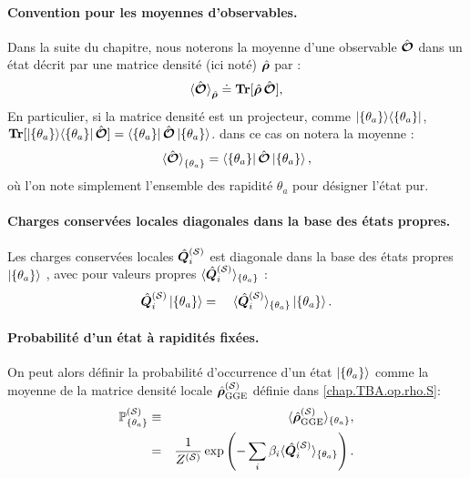 \paragraph{Convention pour les moyennes d'observables.}
Dans la suite du chapitre, nous noterons la moyenne d’une observable $\hat{\bm{\mathcal{O}}}$ dans un état décrit par une matrice densité (ici noté) $\hat{\bm{\rho}}$ par :
\begin{eqnarray}\label{chap.TBA.moy.dens}	
	\braket{\hat{\bm{\mathcal{O}}}}_{\hat{\bm{\rho}}} \doteq \bm{\mathrm{Tr}}[\hat{\bm{\rho}} \, \hat{\bm{\mathcal{O}}}],
\end{eqnarray}
En particulier, si la matrice densité est un projecteur, comme $\ket{\{\theta_a \}}\!\bra{\{\theta_a \}}$, $\bm{\mathrm{Tr}}[\ket{\{\theta_a \}}\!\bra{\{\theta_a \}} \hat{\bm{\mathcal{O}}}] =  \bra{\{\theta_a \}}\hat{\bm{\mathcal{O}}}\ket{\{\theta_a \}}$. dans ce cas on notera la moyenne :
\begin{eqnarray}\label{chap.TBA.moy.dens.pur}
	\braket{\hat{\bm{\mathcal{O}}}}_{\{\theta_a \}} = \bra{\{\theta_a \}} \hat{\bm{\mathcal{O}}} \ket{\{\theta_a \}},
\end{eqnarray}
où l’on note simplement l’ensemble des rapidité ${\theta_a}$ pour désigner l’état pur.

\paragraph{Charges conservées locales diagonales dans la base des états propres.}
Les charges conservées locales $\hat{\bm{Q}}_i^{(\mathcal{S})}$ est diagonale dans la base des  états propres $\ket{ \{ \theta_a \}}$ , avec pour valeurs propres $\langle \hat{\bm{Q}}_i^{(\mathcal{S})} \rangle_{\{\theta_a \}} $ 	 :
\begin{eqnarray}\label{chap.TBA.Qi.diag}
	\operator{Q}_i^{(\mathcal{S})}\ket{\{\theta_a \}} & = &  \langle \operator{Q}_i^{(\mathcal{S})} \rangle_{\{\theta_a \}}  \ket{\{\theta_a \}}.		
\end{eqnarray}
\paragraph{Probabilité d’un état à rapidités fixées.}
On peut alors définir la probabilité d’occurrence d’un état $\ket{\{ \theta_a \} }$ comme la moyenne de la matrice densité locale $\hat{\bm{\rho}}^{(\mathcal{S})}_{\mathrm{GGE}}$ définie dans \eqref{chap.TBA.op.rho.S}:
\begin{eqnarray}
	\mathbb{P}^{(\mathcal{S})}_{\{ \theta_a \}}  & \equiv &  \langle \hat{\bm{\rho}}^{(\mathcal{S})}_{\mathrm{GGE}} \rangle_{\{\theta_a \}}, \label{chap.TBA.P.1}\\
	& = & 
	\frac{1}{Z^{(\mathcal{S})}} \exp \left (- \sum_i \beta_i \langle \hat{\bm{Q}}_i^{(\mathcal{S})} \rangle_{\{\theta_a \}} \right ) \label{chap.TBA.P.2}.
\end{eqnarray}

